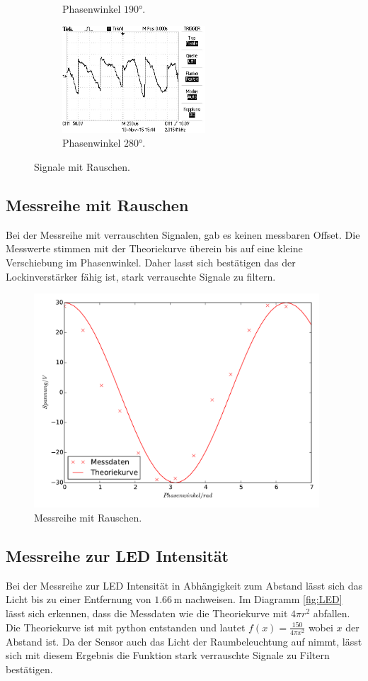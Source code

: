 \begin{figure}
\begin{subfigure}{0.48\textwidth}
    \caption{Phasenwinkel $190°$.}
    \label{fig:rp190}
  \end{subfigure}
  \begin{subfigure}{0.48\textwidth}
    \centering
    \includegraphics[height=4cm]{Bilder/r/r280.JPG}
    \caption{Phasenwinkel $280°$.}
    \label{fig:rp280}
  \end{subfigure}
\caption{Signale mit Rauschen.}
\label{fig:Signale mit Rauschen}
\end{figure}

\subsection{Messreihe mit Rauschen}
\label{sec:Messreihe mit Rauschen}
Bei der Messreihe mit verrauschten Signalen, gab es keinen messbaren Offset. Die
Messwerte stimmen mit der Theoriekurve überein bis auf eine kleine Verschiebung
im Phasenwinkel. Daher lasst sich bestätigen das der Lockinverstärker fähig ist,
stark verrauschte Signale zu filtern.
\begin{figure}
  \centering
  \includegraphics[height=8cm]{r_signal.pdf}
  \caption{Messreihe mit Rauschen.}
  \label{fig:Mr}
\end{figure}

\subsection{Messreihe zur LED Intensität}
\label{sec:Messreihe zur LED intensität}
Bei der Messreihe zur LED Intensität in Abhängigkeit zum Abstand lässt sich das
Licht bis zu einer Entfernung von $1.66\,\si{\meter}$ nachweisen. Im Diagramm
\ref{fig:LED} lässt sich erkennen, dass die Messdaten wie die Theoriekurve mit
$ 4\pi r^2$ abfallen. Die Theoriekurve ist mit python entstanden und lautet
$f(x)=\frac{150}{4\pi x^2}$ wobei $x$ der Abstand ist. Da der Sensor auch das Licht
der Raumbeleuchtung auf nimmt, lässt sich mit diesem Ergebnis die Funktion stark
verrauschte Signale zu Filtern bestätigen.

